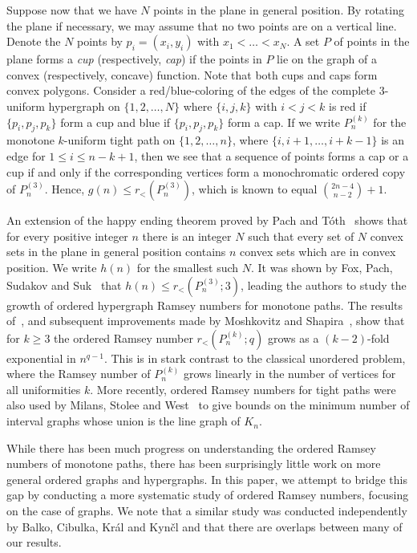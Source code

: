 \documentclass[11pt]{article}
\newcommand{\rord}{r_{<}}
\begin{document}
Suppose now that we have $N$ points in the plane in general position. By rotating the plane if necessary, we may assume that no two points are on a vertical line. Denote the $N$ points by  $p_i=(x_i,y_i)$ with $x_1<\ldots<x_N$. A set $P$ of points in the plane forms a {\it cup} (respectively, {\it cap}) if the points in $P$ lie on the graph of a convex (respectively, concave) function. Note that both cups and caps form convex polygons. Consider a red/blue-coloring of the edges of the complete $3$-uniform hypergraph on $\{1,2,\ldots,N\}$ where $\{i,j,k\}$ with $i<j<k$ is red if $\{p_i,p_j,p_k\}$ form a cup and blue if $\{p_i,p_j,p_k\}$ form a cap. If we write $P^{(k)}_n$ for the monotone $k$-uniform tight path on $\{1,2,\ldots,n\}$,  where $\{i,i+1,\ldots,i+k-1\}$ is an edge for $1 \leq i \leq n-k+1$, then we see that a sequence of points forms a cap or a cup if and only if the corresponding vertices form a monochromatic ordered copy of $P^{(3)}_n$. Hence, $g(n) \leq \rord(P^{(3)}_n)$, which is known to equal ${2n-4 \choose n-2}+1$. 

An extension of the happy ending theorem proved by Pach and T\'oth~\cite{PT00} shows that for every positive integer $n$ there is an integer $N$ such that every set of $N$ convex sets in the plane in general position contains $n$ convex sets which are in convex position. We write $h(n)$ for the smallest such $N$. It was shown by Fox, Pach, Sudakov and Suk~\cite{FPSS12} that $h(n) \leq \rord(P^{(3)}_n; 3)$, leading the authors to study the growth of ordered hypergraph Ramsey numbers for monotone paths. The results of~\cite{FPSS12}, and subsequent improvements made by Moshkovitz and Shapira~\cite{MS13}, show that for $k \geq 3$ the ordered Ramsey number $\rord(P^{(k)}_n; q)$ grows as a $(k-2)$-fold exponential in $n^{q-1}$. This is in stark contrast to the classical unordered problem, where the Ramsey number of $P_n^{(k)}$ grows linearly in the number of vertices for all uniformities $k$. More recently, ordered Ramsey numbers for tight paths were also used by Milans, Stolee and West~\cite{MSW} to give bounds on the minimum number of interval graphs whose union is the line graph of $K_n$. 

While there has been much progress on understanding the ordered Ramsey numbers of monotone paths, there has been surprisingly little work on more general ordered graphs and hypergraphs. In this paper, we attempt to bridge this gap by conducting a more systematic study of ordered Ramsey numbers, focusing on the case of graphs. We note that a similar study was conducted independently by Balko, Cibulka, Kr\'al and Kyn\v cl \cite{BCKK14} and that there are overlaps between many of our results.
\end{document}
